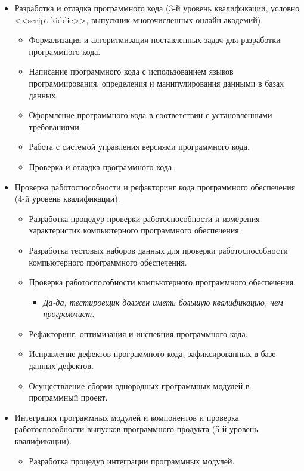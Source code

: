 \documentclass{../../text-style}
\begin{document}
\begin{itemize}
    \item Разработка и отладка программного кода (3-й уровень квалификации, условно <<script kiddie>>, выпускник многочисленных онлайн-академий).
    \begin{itemize}
        \item Формализация и алгоритмизация поставленных задач для разработки программного кода.
        \item Написание программного кода с использованием языков программирования, определения и манипулирования данными в базах данных.
        \item Оформление программного кода в соответствии с установленными требованиями.
        \item Работа с системой управления версиями программного кода.
        \item Проверка и отладка программного кода.
    \end{itemize}
    \item Проверка работоспособности и рефакторинг кода программного обеспечения (4-й уровень квалификации).
    \begin{itemize}
        \item Разработка процедур проверки работоспособности и измерения характеристик компьютерного программного обеспечения.
        \item Разработка тестовых наборов данных для проверки работоспособности компьютерного программного обеспечения.
        \item Проверка работоспособности компьютерного программного обеспечения.
        \begin{itemize}
            \item \emph{Да-да, тестировщик должен иметь большую квалификацию, чем программист.}
        \end{itemize}
        \item Рефакторинг, оптимизация и инспекция программного кода.
        \item Исправление дефектов программного кода, зафиксированных в базе данных дефектов.
        \item Осуществление сборки однородных программных модулей в программный проект.
    \end{itemize}
    \item Интеграция программных модулей и компонентов и проверка работоспособности выпусков программного продукта (5-й уровень квалификации).
    \begin{itemize}
        \item Разработка процедур интеграции программных модулей.

\end{itemize}
\end{itemize}
\end{document}
